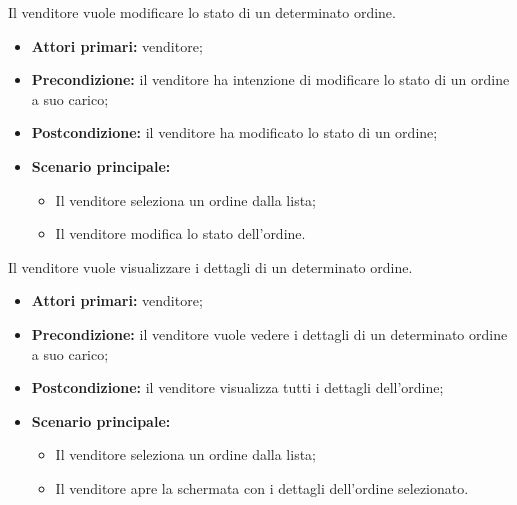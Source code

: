Il venditore vuole modificare lo stato di un determinato ordine.
\begin{itemize}
	\item \textbf{Attori primari:} venditore;
	\item \textbf{Precondizione:} il venditore ha intenzione di modificare lo stato di un ordine a suo carico;
	\item \textbf{Postcondizione:} il venditore ha modificato lo stato di un ordine;
	\item \textbf{Scenario principale:}
	\begin{itemize}
		\item Il venditore seleziona un ordine dalla lista;
		\item Il venditore modifica lo stato dell'ordine.
	\end{itemize}
\end{itemize}

Il venditore vuole visualizzare i dettagli di un determinato ordine.
\begin{itemize}
	\item \textbf{Attori primari:} venditore;
	\item \textbf{Precondizione:} il venditore vuole vedere i dettagli di un determinato ordine a suo carico;
	\item \textbf{Postcondizione:} il venditore visualizza tutti i dettagli dell'ordine;
	\item \textbf{Scenario principale:}
	\begin{itemize}
		\item Il venditore seleziona un ordine dalla lista;
		\item Il venditore apre la schermata con i dettagli dell'ordine selezionato.
	\end{itemize}
\end{itemize}

